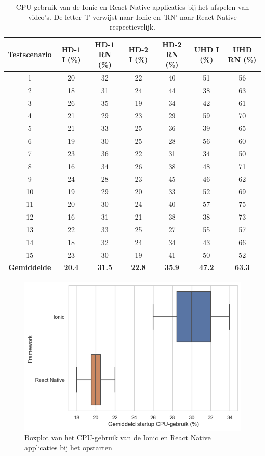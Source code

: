 \begin{table}[htbp]
  \centering
  \footnotesize
  \begin{tabular}{|c|c|c|c|c|c|c|}
      \hline
      \textbf{Testscenario} & \textbf{HD-1 I (\%)} & \textbf{HD-1 RN (\%)} & \textbf{HD-2 I (\%)} & \textbf{HD-2 RN (\%)} & \textbf{UHD I (\%)} & \textbf{UHD RN (\%)} \\
      \hline
      1 & 20 & 32 & 22 & 40 & 51 & 56 \\
      \hline
      2 & 18 & 31 & 24 & 44 & 38 & 63 \\
      \hline
      3 & 26 & 35 & 19 & 34 & 42 & 61 \\
      \hline
      4 & 21 & 29 & 23 & 29 & 59 & 70 \\
      \hline
      5 & 21 & 33 & 25 & 36 & 39 & 65 \\
      \hline
      6 & 19 & 30 & 25 & 28 & 56 & 60 \\
      \hline
      7 & 23 & 36 & 22 & 31 & 34 & 50 \\
      \hline
      8 & 16 & 34 & 26 & 38 & 48 & 71 \\
      \hline
      9 & 24 & 28 & 23 & 45 & 46 & 62 \\
      \hline
      10 & 19 & 29 & 20 & 33 & 52 & 69 \\
      \hline
      11 & 20 & 30 & 24 & 40 & 57 & 75 \\
      \hline
      12 & 16 & 31 & 21 & 38 & 38 & 73 \\
      \hline
      13 & 22 & 33 & 25 & 27 & 55 & 57 \\
      \hline
      14 & 18 & 32 & 24 & 34 & 43 & 66 \\
      \hline
      15 & 23 & 30 & 19 & 41 & 50 & 52 \\
      \hline
      \textbf{Gemiddelde} & \textbf{20.4} & \textbf{31.5} & \textbf{22.8} & \textbf{35.9} & \textbf{47.2} & \textbf{63.3} \\
      \hline
  \end{tabular}
  \caption{CPU-gebruik van de Ionic en React Native applicaties bij het afspelen van video's. De letter 'I' verwijst naar Ionic en 'RN' naar React Native respectievelijk.}
  \label{tab:cpu2}
\end{table}

\begin{figure}
  \centering
  \includegraphics[width=0.7\linewidth]{img/cpu/startup}
  \caption{Boxplot van het CPU-gebruik van de Ionic en React Native applicaties bij het opstarten}
  \label{fig:Boxplot van het CPU-gebruik van de Ionic en React Native applicaties bij het opstarten}
\end{figure}


